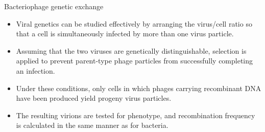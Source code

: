 \documentclass[ignorenonframetext,aspectratio=169]{beamer}
\providecommand{\tightlist}{%
  \setlength{\itemsep}{0pt}\setlength{\parskip}{0pt}}
\begin{document}
\begin{frame}{Bacteriophage genetic exchange}
\protect\hypertarget{bacteriophage-genetic-exchange}{}

\begin{itemize}
\tightlist
\item
  Viral genetics can be studied effectively by arranging the virus/cell
  ratio so that a cell is simultaneously infected by more than one virus
  particle.
\item
  Assuming that the two viruses are genetically distinguishable,
  selection is applied to prevent parent-type phage particles from
  successfully completing an infection.
\item
  Under these conditions, only cells in which phages carrying
  recombinant DNA have been produced yield progeny virus particles.
\item
  The resulting virions are tested for phenotype, and recombination
  frequency is calculated in the same manner as for bacteria.
\end{itemize}

\end{frame}
\end{document}

